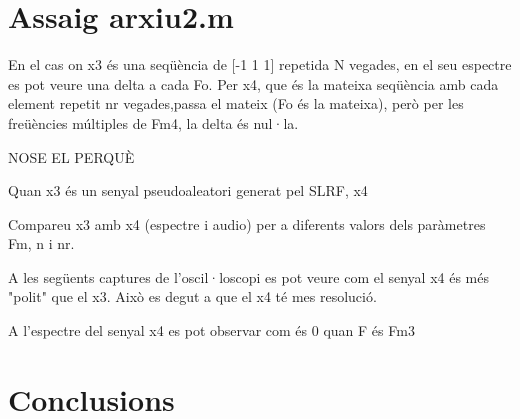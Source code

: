 \documentclass[11pt]{report}
\begin{document}
\section*{Assaig arxiu2.m}


En el cas on x3 és una seqüència de [-1 1 1] repetida N vegades, en el seu espectre es pot veure una delta a cada Fo.
Per x4, que és la mateixa seqüència amb cada element repetit nr vegades,passa el mateix (Fo és la mateixa), però per les freüències múltiples de Fm4, la delta és nul·la.




NOSE EL PERQUÈ

Quan x3 és un senyal pseudoaleatori generat pel SLRF, x4 



Compareu x3 amb x4 (espectre i audio) per a diferents valors dels paràmetres Fm, n i nr.


A les següents captures de l'oscil·loscopi es pot veure com el senyal x4 és més "polit" que el x3. Això es degut a que el x4 té mes resolució.

A l'espectre del senyal x4 es pot observar com és 0 quan F és Fm3
\section{Conclusions}
\end{document}
